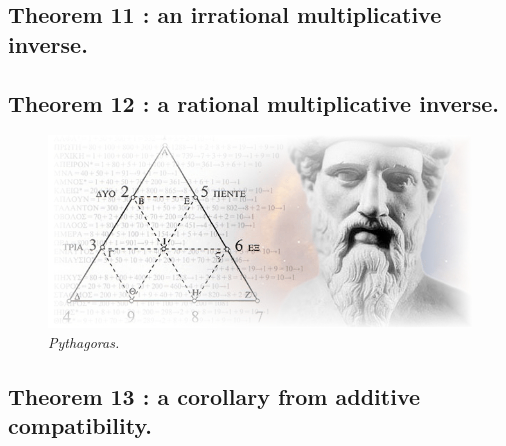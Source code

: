 \documentclass[preview]{standalone}
\begin{document}
\subsection[An irrational multiplicative inverse.]{\color{section} Theorem 11 \color{black} : an irrational multiplicative inverse.}

\pagebreak


\subsection[A rational multiplicative inverse.]{\color{section} Theorem 12 \color{black} : a rational multiplicative inverse.}

\begin{figure}[h!]
    \centering
    \includegraphics[width=13cm]{../resources/jpg/1.6.introduction.to.proofs/pythagoras.jpg}
    \caption*{\emph{Pythagoras.}}
\end{figure}


\subsection[A corollary from additive compatibility.]{\color{section} Theorem 13 \color{black} : a corollary from additive compatibility.}

\pagebreak


\end{document}
